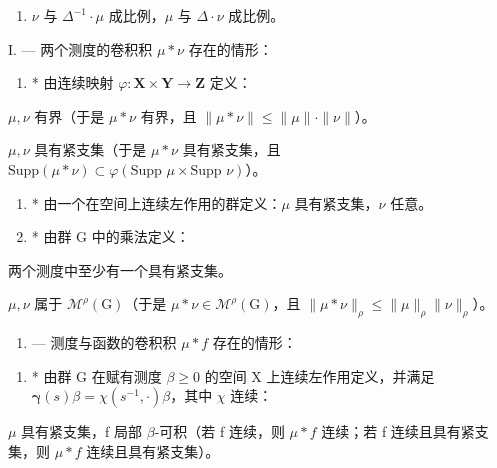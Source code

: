 \begin{enumerate}
\def\labelenumi{\arabic{enumi})}
\setcounter{enumi}{2}
\tightlist
\item
  \(\nu\) 与 \(\Delta^{-1} \cdot \mu\) 成比例，\(\mu\) 与 \(\Delta \cdot \nu\) 成比例。
\end{enumerate}


I. --- 两个测度的卷积积 \(\mu * \nu\) 存在的情形：

\begin{enumerate}
\def\labelenumi{(\alph{enumi})}
\tightlist
\item
  * 由连续映射 \(\varphi : \mathbf{X} \times \mathbf{Y} \to \mathbf{Z}\) 定义：
\end{enumerate}

\(\mu, \nu\) 有界（于是 \(\mu * \nu\) 有界，且 \(\| \mu * \nu \| \leqslant \| \mu \| \cdot \| \nu \|\)）。

\(\mu, \nu\) 具有紧支集（于是 \(\mu * \nu\) 具有紧支集，且 \(\text{Supp}(\mu * \nu) \subset \varphi(\text{Supp } \mu \times \text{Supp } \nu)\)）。

\begin{enumerate}
\def\labelenumi{(\alph{enumi})}
\setcounter{enumi}{1}
\item
  * 由一个在空间上连续左作用的群定义：\(\mu\) 具有紧支集，\(\nu\) 任意。
\item
  * 由群 G 中的乘法定义：
\end{enumerate}

两个测度中至少有一个具有紧支集。

\(\mu, \nu\) 属于 \(\mathcal{M}^{\rho}(\mathrm{G})\)（于是 \(\mu * \nu \in \mathcal{M}^{\rho}(\mathrm{G})\)，且 \(\| \mu * \nu \|_{\rho} \leqslant \| \mu \|_{\rho} \| \nu \|_{\rho}\)）。

\begin{enumerate}
\def\labelenumi{\Roman{enumi}.}
\setcounter{enumi}{1}
\tightlist
\item
  --- 测度与函数的卷积积 \(\mu*f\) 存在的情形：
\end{enumerate}

\begin{enumerate}
\def\labelenumi{(\alph{enumi})}
\tightlist
\item
  * 由群 G 在赋有测度 \(\beta \geqslant 0\) 的空间 X 上连续左作用定义，并满足 \(\pmb{\gamma}(s)\beta = \chi(s^{-1},\cdot)\beta\)，其中 \(\chi\) 连续：
\end{enumerate}

\(\mu\) 具有紧支集，f 局部 \(\beta\)-可积（若 f 连续，则 \(\mu * f\) 连续；若 f 连续且具有紧支集，则 \(\mu * f\) 连续且具有紧支集）。

